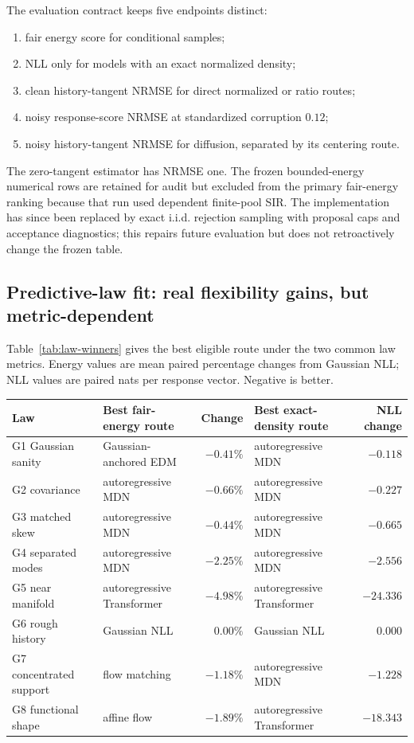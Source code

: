 The evaluation contract keeps five endpoints distinct:
\begin{enumerate}
  \item fair energy score for conditional samples;
  \item NLL only for models with an exact normalized density;
  \item clean history-tangent NRMSE for direct normalized or ratio routes;
  \item noisy response-score NRMSE at standardized corruption $0.12$;
  \item noisy history-tangent NRMSE for diffusion, separated by its centering
  route.
\end{enumerate}
The zero-tangent estimator has NRMSE one.  The frozen bounded-energy numerical
rows are retained for audit but excluded from the primary fair-energy ranking
because that run used dependent finite-pool SIR.  The implementation has since
been replaced by exact i.i.d. rejection sampling with proposal caps and acceptance
diagnostics; this repairs future evaluation but does not retroactively change the
frozen table.

\subsection{Predictive-law fit: real flexibility gains, but metric-dependent}

Table~\ref{tab:law-winners} gives the best eligible route under the two common law
metrics.  Energy values are mean paired percentage changes from Gaussian NLL;
NLL values are paired nats per response vector.  Negative is better.

\begin{center}
\begin{tabularx}{\linewidth}{@{}l X r X r@{}}
\toprule
Law & Best fair-energy route & Change & Best exact-density route & NLL change \\
\midrule
G1 Gaussian sanity & Gaussian-anchored EDM & $-0.41\%$ & autoregressive MDN & $-0.118$ \\
G2 covariance & autoregressive MDN & $-0.66\%$ & autoregressive MDN & $-0.227$ \\
G3 matched skew & autoregressive MDN & $-0.44\%$ & autoregressive MDN & $-0.665$ \\
G4 separated modes & autoregressive MDN & $-2.25\%$ & autoregressive MDN & $-2.556$ \\
G5 near manifold & autoregressive Transformer & $-4.98\%$ & autoregressive Transformer & $-24.336$ \\
G6 rough history & Gaussian NLL & $0.00\%$ & Gaussian NLL & $0.000$ \\
G7 concentrated support & flow matching & $-1.18\%$ & autoregressive MDN & $-1.228$ \\
G8 functional shape & affine flow & $-1.89\%$ & autoregressive Transformer & $-18.343$ \\
\bottomrule
\end{tabularx}
\label{tab:law-winners}
\end{center}

